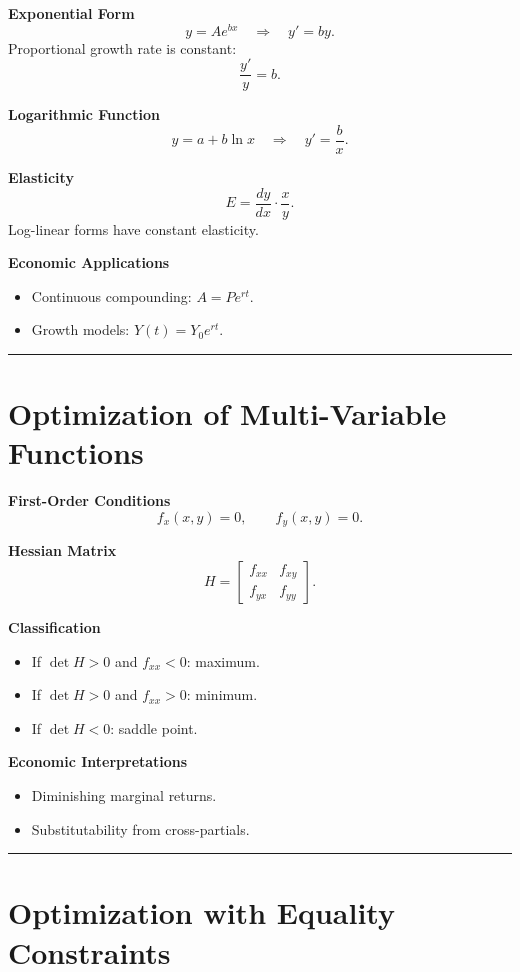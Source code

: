 \documentclass[12pt]{article}
\begin{document}
\textbf{Exponential Form}
\[
y=Ae^{bx}\quad\Rightarrow\quad y' = by.
\]
Proportional growth rate is constant:
\[
\frac{y'}{y}=b.
\]

\textbf{Logarithmic Function}
\[
y=a+b\ln x \quad\Rightarrow\quad y'=\frac{b}{x}.
\]

\textbf{Elasticity}
\[
E = \frac{dy}{dx}\cdot\frac{x}{y}.
\]
Log-linear forms have constant elasticity.

\textbf{Economic Applications}
\begin{itemize}
    \item Continuous compounding: \(A=Pe^{rt}\).
    \item Growth models: \(Y(t)=Y_0 e^{rt}\).
\end{itemize}

\hrule
\vspace{10pt}

\section*{Optimization of Multi-Variable Functions}

\textbf{First-Order Conditions}
\[
f_x(x,y)=0,\qquad f_y(x,y)=0.
\]

\textbf{Hessian Matrix}
\[
H = 
\begin{bmatrix}
f_{xx} & f_{xy}\\
f_{yx} & f_{yy}
\end{bmatrix}.
\]

\textbf{Classification}
\begin{itemize}
    \item If \(\det H>0\) and \(f_{xx}<0\): maximum.
    \item If \(\det H>0\) and \(f_{xx}>0\): minimum.
    \item If \(\det H<0\): saddle point.
\end{itemize}

\textbf{Economic Interpretations}
\begin{itemize}
    \item Diminishing marginal returns.
    \item Substitutability from cross-partials.
\end{itemize}

\hrule
\vspace{10pt}

\section*{Optimization with Equality Constraints}
\end{document}

